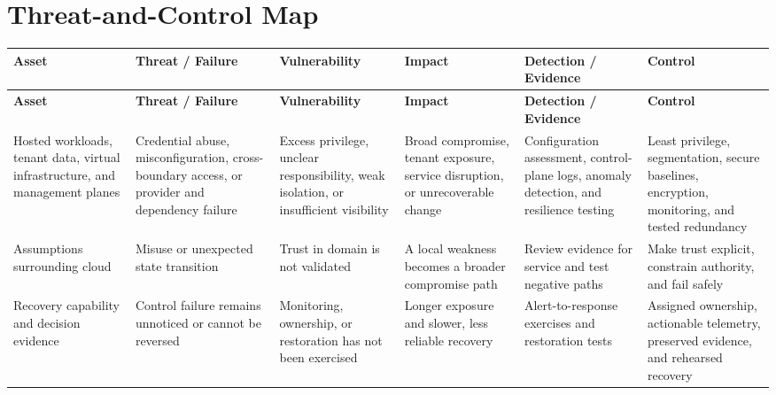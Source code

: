 \documentclass[11pt]{article}
\begin{document}
\section*{Threat-and-Control Map}
\begingroup\scriptsize\setlength{\tabcolsep}{2pt}
\begin{longtable}{>{\RaggedRight\arraybackslash}p{}>{\RaggedRight\arraybackslash}p{}>{\RaggedRight\arraybackslash}p{}>{\RaggedRight\arraybackslash}p{}>{\RaggedRight\arraybackslash}p{}>{\RaggedRight\arraybackslash}p{}}
\toprule\rowcolor{Navy}\color{white}\textbf{Asset} & \color{white}\textbf{Threat / Failure} & \color{white}\textbf{Vulnerability} & \color{white}\textbf{Impact} & \color{white}\textbf{Detection / Evidence} & \color{white}\textbf{Control}\\\midrule
\endfirsthead
\toprule\rowcolor{Navy}\color{white}\textbf{Asset} & \color{white}\textbf{Threat / Failure} & \color{white}\textbf{Vulnerability} & \color{white}\textbf{Impact} & \color{white}\textbf{Detection / Evidence} & \color{white}\textbf{Control}\\\midrule
\endhead
Hosted workloads, tenant data, virtual infrastructure, and management planes & Credential abuse, misconfiguration, cross-boundary access, or provider and dependency failure & Excess privilege, unclear responsibility, weak isolation, or insufficient visibility & Broad compromise, tenant exposure, service disruption, or unrecoverable change & Configuration assessment, control-plane logs, anomaly detection, and resilience testing & Least privilege, segmentation, secure baselines, encryption, monitoring, and tested redundancy\\\midrule
Assumptions surrounding cloud & Misuse or unexpected state transition & Trust in domain is not validated & A local weakness becomes a broader compromise path & Review evidence for service and test negative paths & Make trust explicit, constrain authority, and fail safely\\\midrule
Recovery capability and decision evidence & Control failure remains unnoticed or cannot be reversed & Monitoring, ownership, or restoration has not been exercised & Longer exposure and slower, less reliable recovery & Alert-to-response exercises and restoration tests & Assigned ownership, actionable telemetry, preserved evidence, and rehearsed recovery\\\midrule
\bottomrule
\end{longtable}
\endgroup
\end{document}
